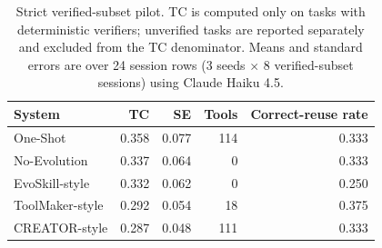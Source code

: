 \begin{table}[t]
\centering
\small
\caption{Strict verified-subset pilot. TC is computed only on tasks with deterministic verifiers; unverified tasks are reported separately and excluded from the TC denominator. Means and standard errors are over 24 session rows (3 seeds $\times$ 8 verified-subset sessions) using Claude Haiku 4.5.}
\label{tab:strict-results}
\begin{tabular}{lrrrr}
\toprule
\textbf{System} & \textbf{TC} & \textbf{SE} & \textbf{Tools} & \textbf{Correct-reuse rate} \\
\midrule
One-Shot & 0.358 & 0.077 & 114 & 0.333 \\
No-Evolution & 0.337 & 0.064 & 0 & 0.333 \\
EvoSkill-style & 0.332 & 0.062 & 0 & 0.250 \\
ToolMaker-style & 0.292 & 0.054 & 18 & 0.375 \\
CREATOR-style & 0.287 & 0.048 & 111 & 0.333 \\
\bottomrule
\end{tabular}
\end{table}
